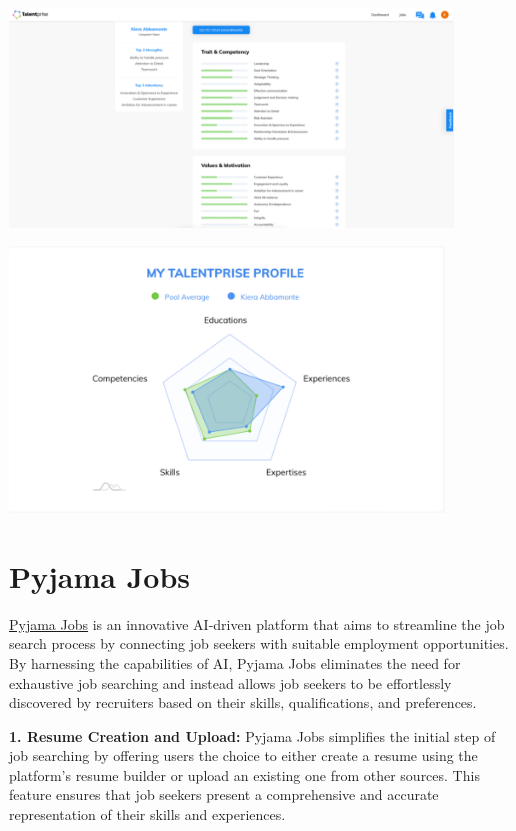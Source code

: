 \documentclass[
]{book}
\begin{document}
\includegraphics[width=4.63542in,height=\textheight]{talentprise1.png}

\includegraphics[width=4.54167in,height=\textheight]{talentprise 2.png}

\hypertarget{pyjama-jobs}{%
\section{Pyjama Jobs}\label{pyjama-jobs}}

\href{https://www.kickresume.com/pyjama-jobs/}{Pyjama Jobs} is an innovative AI-driven platform that aims to streamline the job search process by connecting job seekers with suitable employment opportunities. By harnessing the capabilities of AI, Pyjama Jobs eliminates the need for exhaustive job searching and instead allows job seekers to be effortlessly discovered by recruiters based on their skills, qualifications, and preferences.

\textbf{1. Resume Creation and Upload:} Pyjama Jobs simplifies the initial step of job searching by offering users the choice to either create a resume using the platform's resume builder or upload an existing one from other sources. This feature ensures that job seekers present a comprehensive and accurate representation of their skills and experiences.
\end{document}
